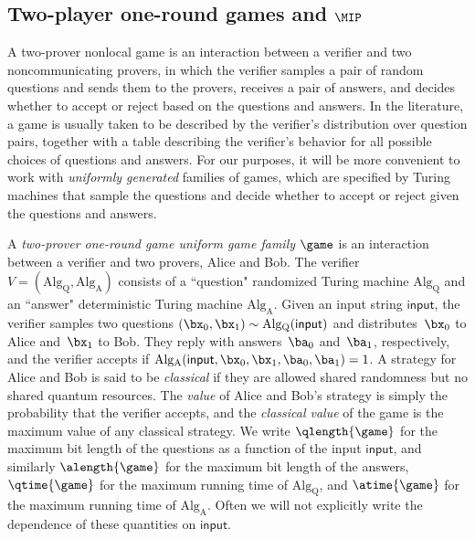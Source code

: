 \subsection{Two-player one-round games and $\MIP$}
A two-prover nonlocal game is an interaction between a verifier and
two noncommunicating provers, in which the verifier samples a pair of random
questions and sends them to the provers, receives a pair of answers,
and decides whether to accept or reject based on the questions and answers. In the literature, a game is usually
taken to be described by the verifier's distribution over question
pairs, together with a table describing the verifier's behavior
for all possible choices of questions and answers. For our purposes,
it will be more convenient to work with \emph{uniformly generated} families of
games, which are specified by Turing machines that sample the
questions and decide whether to accept or reject given the questions
and answers.
\begin{definition}\label{def:two-player-one-round}
A \emph{two-prover one-round game uniform game family} $\game$
is an interaction between a verifier and two provers, Alice and Bob.
The verifier $V = (\mathrm{Alg_{\mathrm{Q}}}, \mathrm{Alg_{\mathrm{A}}})$
consists of a ``question" randomized Turing machine $\mathrm{Alg_{\mathrm{Q}}}$
and an ``answer" deterministic Turing machine $\mathrm{Alg_{\mathrm{A}}}$.
Given an input string $\mathsf{input}$, the verifier samples two questions
$(\bx_0, \bx_1) \sim \mathrm{Alg_{\mathrm{Q}}}(\mathsf{input})$ and distributes~$\bx_0$ to Alice and~$\bx_1$ to Bob.
They reply with answers~$\ba_0$ and~$\ba_1$, respectively, and the verifier accepts if
$\mathrm{Alg_{\mathrm{A}}}(\mathsf{input}, \bx_0, \bx_1, \ba_0, \ba_1) = 1$.
A strategy for Alice and Bob is said to be \emph{classical} if they are allowed shared randomness but no shared quantum resources.
The \emph{value} of Alice and Bob's strategy is simply the probability that the verifier accepts,
and the \emph{classical value} of the game is the maximum value of any classical strategy.
We write $\qlength{\game}$ for the maximum bit length
of the questions as a function of the input $\mathsf{input}$, and similarly
$\alength{\game}$ for the maximum bit length of the answers,
$\qtime{\game}$ for the maximum running time of $\mathrm{Alg}_{\mathrm{Q}}$,
and $\atime{\game}$ for the maximum running time of
$\mathrm{Alg}_{\mathrm{A}}$. Often we will not explicitly write the
dependence of these quantities on $\mathsf{input}$.
\end{definition}

